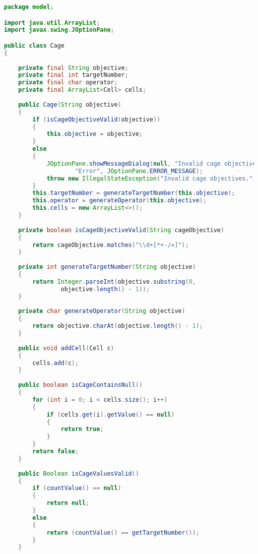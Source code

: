 \begin{lstlisting}[language=Java,basicstyle=\tiny,caption=Cage.java]
package model;

import java.util.ArrayList;
import javax.swing.JOptionPane;

public class Cage
{
    
    private final String objective;
    private final int targetNumber;
    private final char operator;
    private final ArrayList<Cell> cells;
    
    public Cage(String objective)
    {
        if (isCageObjectiveValid(objective))
        {
            this.objective = objective;
        }
        else
        {
            JOptionPane.showMessageDialog(null, "Invalid cage objectives.", 
                    "Error", JOptionPane.ERROR_MESSAGE);
            throw new IllegalStateException("Invalid cage objectives.");
        }
        this.targetNumber = generateTargetNumber(this.objective);
        this.operator = generateOperator(this.objective);
        this.cells = new ArrayList<>();
    }
    
    private boolean isCageObjectiveValid(String cageObjective)
    {
        return cageObjective.matches("\\d+[*+-/=]");
    }
    
    private int generateTargetNumber(String objective)
    {
        return Integer.parseInt(objective.substring(0, 
                objective.length() - 1));
    }
    
    private char generateOperator(String objective)
    {
        return objective.charAt(objective.length() - 1);
    }
    
    public void addCell(Cell c)
    {
        cells.add(c);
    }
    
    public boolean isCageContainsNull()
    {
        for (int i = 0; i < cells.size(); i++)
        {
            if (cells.get(i).getValue() == null)
            {
                return true;
            }
        }
        return false;
    }
    
    public Boolean isCageValuesValid()
    {
        if (countValue() == null)
        {
            return null;
        }
        else
        {
            return (countValue() == getTargetNumber());
        }
    }
    

\end{lstlisting}
